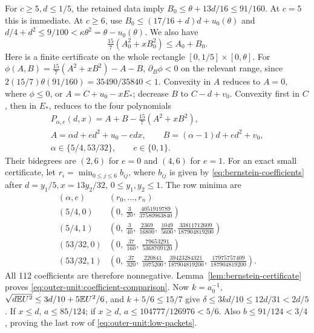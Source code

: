 For \(c\ge5,d\le1/5\), the retained data imply
\(B_0\le\theta+13d/16\le91/160\).
At \(c=5\) this is immediate. At \(c\ge6\), use
\(B_0\le(17/16+d)d+u_0(\theta)\) and
\(d/4+d^2\le9/100<\kappa\theta^2=\theta-u_0(\theta)\).
We also have
\begin{equation}\label{eq:outer-unit:coefficient-comparison}
 \tfrac{15}{7}(A_0^2+xB_0^2)\le A_0+B_0.
\end{equation}
Here is a finite certificate on the whole rectangle
\([0,1/5]\times[0,\theta]\).
For \(\phi(A,B)=\tfrac{15}{7}(A^2+xB^2)-A-B\),
\(\partial_B\phi<0\) on the relevant range, since
\(2(15/7)\theta(91/160)=35490/35840<1\).
Convexity in \(A\) reduces to \(A=0\), where \(\phi\le0\), or
\(A=C+u_0-xE_*\); decrease \(B\) to \(C-d+v_0\).
Convexity first in \(C\), then in \(E_*\), reduces to the four polynomials
\begin{equation}\label{eq:outer-unit:phi-polynomials}
\begin{gathered}
 P_{\alpha,e}(d,x)=A+B-\tfrac{15}{7}(A^2+xB^2),\\
 A=\alpha d+ed^2+u_0-edx,\qquad
 B=(\alpha-1)d+ed^2+v_0,\\
 \alpha\in\{5/4,53/32\},\qquad e\in\{0,1\}.
\end{gathered}
\end{equation}
Their bidegrees are \((2,6)\) for \(e=0\) and \((4,6)\) for \(e=1\).
For an exact small certificate, let \(r_i=\min_{0\le j\le6}b_{ij}\),
where \(b_{ij}\) is given by \eqref{eq:bernstein-coefficients} after
\(d=y_1/5,x=13y_2/32\), \(0\le y_1,y_2\le1\). The row minima are
\begin{equation}\label{eq:outer-unit:phi-certificates}
\begin{array}{c|l}
 (\alpha,e)&(r_0,\ldots,r_n)\\\hline
 (5/4,0)&(0,\ \frac3{20},\ \frac{4051919789}{37580963840})\\[3pt]
 (5/4,1)&(0,\ \frac3{40},\ \frac{2369}{16800},\ \frac{1049}{5600},
                     \frac{33811712609}{187904819200})\\[3pt]
 (53/32,0)&(0,\ \frac{37}{160},\ \frac{79653291}{5368709120})\\[3pt]
 (53/32,1)&(0,\ \frac{37}{320},\ \frac{220841}{1075200},
              \frac{39423284321}{187904819200},\ \frac{17975757409}{187904819200}).
\end{array}
\end{equation}
All 112 coefficients are therefore nonnegative.
Lemma~\ref{lem:bernstein-certificate} proves
\eqref{eq:outer-unit:coefficient-comparison}.
Now \(k=a_0^{-1}\), \(\sqrt{d\mathbb E U^2}\le3d/10+5\mathbb E U^2/6\), and
\(k+5/6\le15/7\) give \(\delta\le3kd/10\le12d/31<2d/5\).
If \(x\le d\), \(a\le85/124\); if \(x\ge d\),
\(a\le104777/126976<5/6\). Also \(b\le91/124<3/4\), proving the
last row of \eqref{eq:outer-unit:low-packets}.

